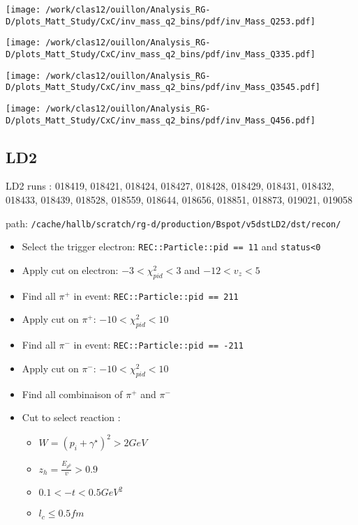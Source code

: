 \documentclass{report}
\begin{document}
    \begin{minipage}{.5\textwidth}
        \centering
        \texttt{[image: /work/clas12/ouillon/Analysis\_RG-D/plots\_Matt\_Study/CxC/inv\_mass\_q2\_bins/pdf/inv\_Mass\_Q253.pdf]}
    \end{minipage}
    \begin{minipage}{.5\textwidth}
        \centering
        \texttt{[image: /work/clas12/ouillon/Analysis\_RG-D/plots\_Matt\_Study/CxC/inv\_mass\_q2\_bins/pdf/inv\_Mass\_Q335.pdf]}
    \end{minipage}

    \begin{minipage}{.5\textwidth}
        \centering
        \texttt{[image: /work/clas12/ouillon/Analysis\_RG-D/plots\_Matt\_Study/CxC/inv\_mass\_q2\_bins/pdf/inv\_Mass\_Q3545.pdf]}
    \end{minipage}
    \begin{minipage}{.5\textwidth}
        \centering
        \texttt{[image: /work/clas12/ouillon/Analysis\_RG-D/plots\_Matt\_Study/CxC/inv\_mass\_q2\_bins/pdf/inv\_Mass\_Q456.pdf]}
    \end{minipage}


    \subsection{LD2}
    LD2 runs : 018419, 018421, 018424, 018427, 018428, 018429, 018431, 018432, 018433, 018439, 018528, 018559, 018644, 018656, 018851, 018873, 019021, 019058
    
    path: \texttt{/cache/hallb/scratch/rg-d/production/Bspot/v5dstLD2/dst/recon/}
    \begin{itemize}
        \item Select the trigger electron: \texttt{REC::Particle::pid == 11} and \texttt{status<0}
        \item Apply cut on electron: \(-3 < \chi^2_{pid} < 3\) and \(-12 < v_z < 5\)
        \item Find all \(\pi^+\) in event: \texttt{REC::Particle::pid == 211}
        \item Apply cut on \(\pi^+\): \(-10 < \chi^2_{pid} < 10\) 
        \item Find all \(\pi^-\) in event: \texttt{REC::Particle::pid == -211}
        \item Apply cut on \(\pi^-\): \(-10 < \chi^2_{pid} < 10\) 
        \item Find all combinaison of \(\pi^+\) and \(\pi^-\)
        \item Cut to select reaction : 
        \begin{itemize}
            \item \(W = (p_i + \gamma^{\star})^2 > 2GeV\)
            \item \(z_h = \frac{E_{\rho^0}}{v}> 0.9\)
            \item \( 0.1 < -t < 0.5 GeV^2\)
            \item \(l_c \le 0.5 fm\)
        \end{itemize} 
    \end{itemize}
\end{document}
